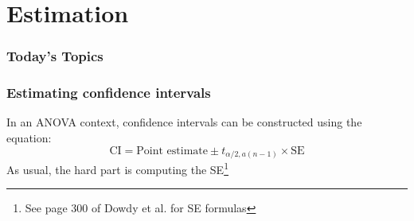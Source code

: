 \documentclass[color=usenames,dvipsnames]{beamer}\usepackage[]{graphicx}\usepackage[]{color}
\begin{document}






\section{Estimation}



\begin{frame}[plain]
  \frametitle{Today's Topics}
  \Large
  \tableofcontents[currentsection]
\end{frame}






\begin{frame}[fragile]
  \frametitle{Estimating confidence intervals}
  In an ANOVA context, confidence intervals can be
  constructed using the equation:
  \[
    \text{CI} = \text{Point estimate} \pm t_{\alpha/2,a(n-1)} \times \text{SE}
  \]
  As usual, the hard part is computing the SE\footnote{See page 300 of
    Dowdy et al. for SE formulas}
\end{frame}





\end{document}
